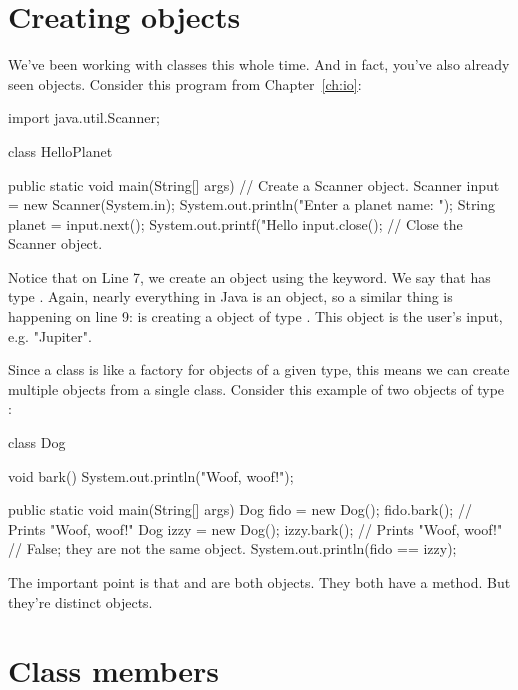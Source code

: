 \section{Creating objects}

We've been working with classes this whole time. And in fact, you've also already seen objects. Consider this program from Chapter~\ref{ch:io}:

\begin{code}
import java.util.Scanner;

class HelloPlanet {

    public static void main(String[] args) {
        // Create a Scanner object.
        Scanner input = new Scanner(System.in);
        System.out.println("Enter a planet name: ");
        String planet = input.next();
        System.out.printf("Hello %
        input.close();  // Close the Scanner object.
    }
}
\end{code}

Notice that on Line 7, we create an object  using the  keyword. We say that  has type . Again, nearly everything in Java is an object, so a similar thing is happening on line 9:  is creating a  object of type . This object is the user's input, e.g. "Jupiter".

Since a class is like a factory for objects of a given type, this means we can create multiple objects from a single class. Consider this example of two objects of type :

\begin{code}
class Dog {

    void bark() {
        System.out.println("Woof, woof!");
    }
    
    public static void main(String[] args) {
        Dog fido = new Dog();
        fido.bark();  // Prints "Woof, woof!"
        Dog izzy = new Dog();
        izzy.bark();  // Prints "Woof, woof!"
        // False; they are not the same object.
        System.out.println(fido == izzy);
    }
}
\end{code}

The important point is that  and  are both  objects. They both have a  method. But they're distinct objects.

\section{Class members}

